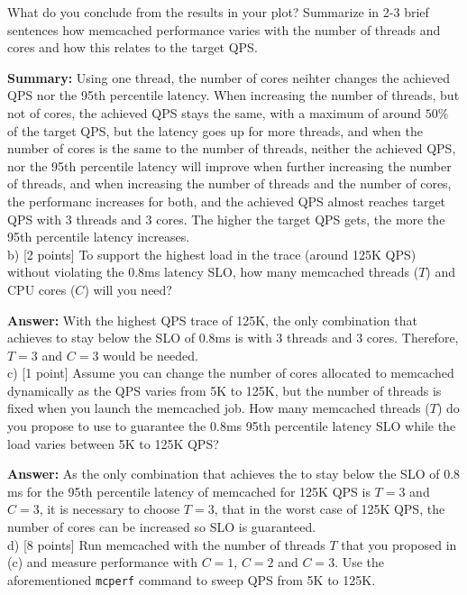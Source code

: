 \begin{enumerate}
    
    What do you conclude from the results in your plot? Summarize in 2-3 brief sentences how memcached performance varies with the number of threads and cores and how this relates to the target QPS.
    
    \textbf{Summary:} %
    Using one thread, the number of cores neihter changes the achieved QPS nor the 95th percentile latency. When increasing the number of threads, but not of cores, the achieved QPS stays the same, with a maximum of around $50\%$ of the target QPS, but the latency goes up for more threads, and when the number of cores is the same to the number of threads, neither the achieved QPS, nor the 95th percentile latency will improve when further increasing the number of threads, and when increasing the number of threads and the number of cores, the performanc increases for both, and the achieved QPS almost reaches target QPS with 3 threads and 3 cores. The higher the target QPS gets, the more the 95th percentile latency increases.
    \\
    
    b) [2 points] To support the highest load in the trace (around 125K QPS) without violating the 0.8ms latency SLO, how many memcached threads ($T$) and CPU cores ($C$) will you need?
    
    \textbf{Answer:} %
    With the highest QPS trace of 125K, the only combination that achieves to stay below the SLO of $0.8$ms is with 3 threads and 3 cores. Therefore, $T=3$ and $C=3$ would be needed.
    \\
    
    c) [1 point] Assume you can change the number of cores allocated to memcached dynamically as the QPS varies from 5K to 125K, but the number of threads is fixed when you launch the memcached job. How many memcached threads ($T$) do you propose to use to guarantee the 0.8ms 95th percentile latency SLO while the load varies between 5K to 125K QPS?
    
    \textbf{Answer:} %
    As the only combination that achieves the to stay below the SLO of $0.8$ms for the 95th percentile latency of memcached for 125K QPS is $T=3$ and $C=3$, it is necessary to choose $T=3$, that in the worst case of 125K QPS, the number of cores can be increased so SLO is guaranteed.
    \\
    
    d) [8 points] Run memcached with the number of threads $T$ that you proposed in (c) and measure performance with $C=1$, $C=2$ and $C=3$. Use the aforementioned \texttt{mcperf} command to sweep QPS from 5K to 125K.


\end{enumerate}
